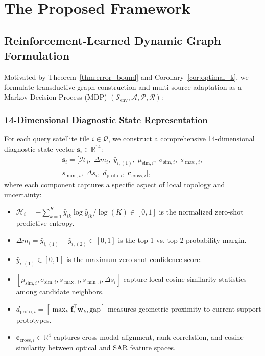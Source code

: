 \section{The Proposed \rllctim{} Framework}
\label{sec:method}



\subsection{Reinforcement-Learned Dynamic Graph Formulation}
Motivated by Theorem~\ref{thm:error_bound} and Corollary~\ref{cor:optimal_k}, we formulate transductive graph construction and multi-source adaptation as a Markov Decision Process (MDP) $(\mathcal{S}_{\text{env}}, \mathcal{A}, \mathcal{P}, \mathcal{R})$:

\subsubsection{14-Dimensional Diagnostic State Representation}
For each query satellite tile $i \in \mathcal{Q}$, we construct a comprehensive 14-dimensional diagnostic state vector $\mathbf{s}_i \in \mathbb{R}^{14}$:
\begin{equation}
\begin{split}
    \mathbf{s}_i = \big[ \bar{\mathcal{H}}_i, \; \Delta m_i, \; \hat{y}_{i,(1)}, \; \mu_{\text{sim}, i}, \; \sigma_{\text{sim}, i}, \; s_{\max, i}, \\
    s_{\min, i}, \; \Delta s_i, \; d_{\text{proto}, i}, \; \bm{c}_{\text{cross}, i} \big],
\end{split}
    \label{eq:state}
\end{equation}
where each component captures a specific aspect of local topology and uncertainty:
\begin{itemize}
    \item $\bar{\mathcal{H}}_i = -\sum_{k=1}^K \hat{y}_{ik} \log \hat{y}_{ik} / \log(K) \in [0, 1]$ is the normalized zero-shot predictive entropy.
    \item $\Delta m_i = \hat{y}_{i,(1)} - \hat{y}_{i,(2)} \in [0, 1]$ is the top-1 vs. top-2 probability margin.
    \item $\hat{y}_{i,(1)} \in [0, 1]$ is the maximum zero-shot confidence score.
    \item $[\mu_{\text{sim}, i}, \sigma_{\text{sim}, i}, s_{\max, i}, s_{\min, i}, \Delta s_i]$ capture local cosine similarity statistics among candidate neighbors.
    \item $d_{\text{proto}, i} = [\max_k \bm{f}_i^\top \bm{w}_k, \text{gap}]$ measures geometric proximity to current support prototypes.
    \item $\bm{c}_{\text{cross}, i} \in \mathbb{R}^4$ captures cross-modal alignment, rank correlation, and cosine similarity between optical and SAR feature spaces.
\end{itemize}

